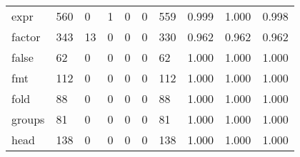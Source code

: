 \begin{longtable}{lp{2.0cm}p{2.0cm}p{2.0cm}p{2.0cm}p{2.0cm}p{2.0cm}p{2.0cm}p{2.0cm}p{2.0cm}}
expr      &                    560 &                                             0 &                                            1 &                                           0 &                                            0 &                                        559 &                                0.999 &                                  1.000 &                                0.998 \\
factor    &                    343 &                                            13 &                                            0 &                                           0 &                                            0 &                                        330 &                                0.962 &                                  0.962 &                                0.962 \\
false     &                     62 &                                             0 &                                            0 &                                           0 &                                            0 &                                         62 &                                1.000 &                                  1.000 &                                1.000 \\
fmt       &                    112 &                                             0 &                                            0 &                                           0 &                                            0 &                                        112 &                                1.000 &                                  1.000 &                                1.000 \\
fold      &                     88 &                                             0 &                                            0 &                                           0 &                                            0 &                                         88 &                                1.000 &                                  1.000 &                                1.000 \\
groups    &                     81 &                                             0 &                                            0 &                                           0 &                                            0 &                                         81 &                                1.000 &                                  1.000 &                                1.000 \\
head      &                    138 &                                             0 &                                            0 &                                           0 &                                            0 &                                        138 &                                1.000 &                                  1.000 &                                1.000 \\

\end{longtable}
